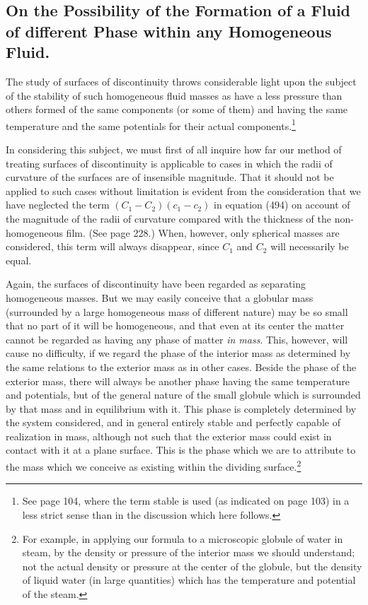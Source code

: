 \documentclass[12pt]{memoir}
\begin{document}
{\subsection{On the Possibility of the Formation of a Fluid of different Phase within any Homogeneous Fluid.}
The study of surfaces of discontinuity throws considerable light upon the subject of the stability of such homogeneous fluid masses as have a less pressure than others formed of the same components (or some of them) and having the same temperature and the same potentials for their actual components.\footnote{See page 104, where the term stable is used (as indicated on page 103) in a less strict sense than in the discussion which here follows.}

In considering this subject, we must first of all inquire how far our method of treating surfaces of discontinuity is applicable to cases in which the radii of curvature of the surfaces are of insensible magnitude. That it should not be applied to such cases without limitation is evident from the consideration that we have neglected the term  $(C_1-C_2) (c_1-c_2)$ in equation (494) on account of the magnitude of the radii of curvature compared with the thickness of the non-homogeneous film. (See page 228.) When, however, only spherical masses are considered, this term will always disappear, since $C_1$ and $C_2$ will necessarily be equal.

Again, the surfaces of discontinuity have been regarded as separating homogeneous masses. But we may easily conceive that a globular mass (surrounded by a large homogeneous mass of different nature) may be so small that no part of it will be homogeneous, and that even at its center the matter cannot be regarded as having any phase of matter \textit{in mass}. This, however, will cause no difficulty, if we regard the phase of the interior mass as determined by the same relations to the exterior mass as in other cases. Beside the phase of the exterior mass, there will always be another phase having the same temperature and potentials, but of the general nature of the small globule which is surrounded by that mass and in equilibrium with it. This phase is completely determined by the system considered, and in general entirely stable and perfectly capable of realization in mass, although not such that the exterior mass could exist in contact with it at a plane surface. This is the phase which we are to attribute to the mass which we conceive as existing within the dividing surface.\footnote{For example, in applying our formula to a microscopic globule of water in steam, by the density or pressure of the interior mass we should understand; not the actual density or pressure at the center of the globule, but the density of liquid water (in large quantities) which has the temperature and potential of the steam.}

}
\end{document}
